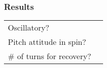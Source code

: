 % 
% 
%
\Large
\subsubsection*{Results}
  \begin{tabular}{p{7.5cm}|p{2cm}|}
    \cline{2-2}
    Oscillatory?&\\
    \cline{2-2}
    Pitch attitude in spin?&\\
    \cline{2-2}
    \# of turns for recovery?&\\
    \cline{2-2}
    \end{tabular}

    \normalsize
    
   